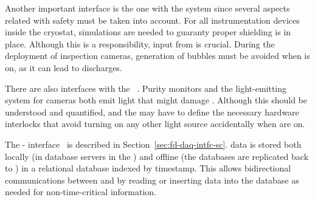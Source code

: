 Another important interface is the one with the  system \cite{bib:docdb6787} since several aspects related with safety must be taken into account. 
For all instrumentation devices inside the cryostat, \efield simulations are needed to guaranty proper shielding is in place.
Although this is a  responsibility, input from  is crucial.
During the deployment of inspection cameras, generation of bubbles must be avoided when  is on, as it can lead to discharges.

There are also interfaces with the ~\cite{bib:docdb6730}. Purity monitors and the light-emitting system for cameras both emit light that might damage .
Although this should be understood and quantified,  and the \single {} may have to define the necessary hardware interlocks
that avoid turning on any other light source accidentally when  are on.

The - interface~\cite{bib:docdb6790} is described in Section~\ref{sec:fd-daq-intfc-sc}. %
 data is stored both locally (in  database servers in the
) and offline (the databases are replicated back to \fnal)
in a relational database indexed by timestamp.
This allows bidirectional communications between  and  by
reading or inserting data into the database as needed for non-time-critical information.  




